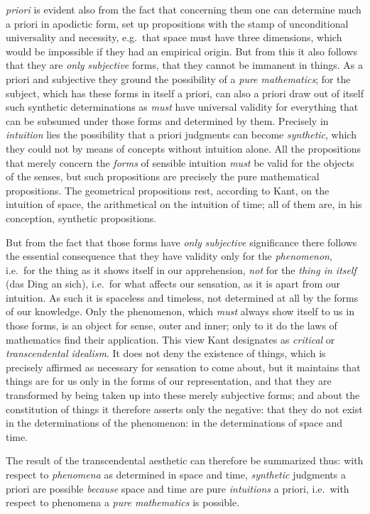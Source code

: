 \emph{priori} is evident also from the fact that concerning them one
can determine much a priori in apodictic form, set up propositions with
the stamp of unconditional universality and necessity, e.g.\ that space
must have three dimensions, which would be
impossible if they had an empirical origin. But from this it
also follows that they are \emph{only} \emph{subjective} forms, that
they cannot be immanent in things. As a priori and subjective they
ground the possibility of a \emph{pure mathematics}; for the subject,
which has these forms in itself a priori, can also a priori draw out of
itself such synthetic determinations as \emph{must} have universal
validity for everything that can be subsumed under those forms and
determined by them. Precisely in \emph{intuition} lies the possibility
that a priori judgments can become \emph{synthetic}, which they could
not by means of concepts without intuition alone. All the propositions
that merely concern the \emph{forms} of sensible intuition \emph{must}
be valid for the objects of the senses, but such propositions are
precisely the pure mathematical propositions. The geometrical
propositions rest, according to Kant, on the intuition of space, the
arithmetical on the intuition of time; all of them are, in his
conception, synthetic propositions.

But from the fact that those forms have \emph{only} \emph{subjective}
significance there follows the essential consequence that they have
validity only for the \emph{phenomenon}, i.e.\ for the thing as it
shows itself in our apprehension, \emph{not} for the \emph{thing in
itself} (das Ding an sich), i.e.\ for what affects our sensation, as it
is apart from our intuition. As such it is spaceless and timeless, not
determined at all by the forms of our knowledge. Only the phenomenon,
which \emph{must} always show itself to us in those forms, is an object
for sense, outer and inner; only to it do the laws of mathematics find
their application. This view Kant designates as \emph{critical} or
\emph{transcendental idealism}. It does not deny the existence of
things, which is precisely affirmed as necessary for sensation to come
about, but it maintains that things are for us only in the forms of our
representation, and that they are transformed by being taken up into
these merely subjective forms; and about the constitution of things it
therefore asserts only the negative: that they do not
exist in the determinations of the phenomenon: in the
determinations of space and time.

The result of the transcendental aesthetic can therefore be summarized
thus: with respect to \emph{phenomena} as determined in space and time,
\emph{synthetic} judgments a priori are possible \emph{because} space
and time are pure \emph{intuitions} a priori, i.e.\ with respect to
phenomena a \emph{pure mathematics} is possible.

